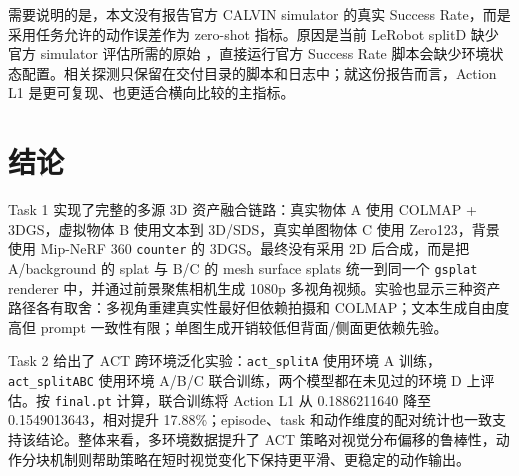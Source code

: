 \documentclass[lang=cn,a4paper,newtx,nofont,code=minted]{elegantpaper}
\begin{document}
需要说明的是，本文没有报告官方 CALVIN simulator 的真实 Success Rate，而是采用任务允许的动作误差作为 zero-shot 指标。原因是当前 LeRobot splitD 缺少官方 simulator 评估所需的原始 ，直接运行官方 Success Rate 脚本会缺少环境状态配置。相关探测只保留在交付目录的脚本和日志中；就这份报告而言，Action L1 是更可复现、也更适合横向比较的主指标。

\section{结论}

Task 1 实现了完整的多源 3D 资产融合链路：真实物体 A 使用 COLMAP + 3DGS，虚拟物体 B 使用文本到 3D/SDS，真实单图物体 C 使用 Zero123，背景使用 Mip-NeRF 360 \texttt{counter} 的 3DGS。最终没有采用 2D 后合成，而是把 A/background 的 splat 与 B/C 的 mesh surface splats 统一到同一个 \texttt{gsplat} renderer 中，并通过前景聚焦相机生成 1080p 多视角视频。实验也显示三种资产路径各有取舍：多视角重建真实性最好但依赖拍摄和 COLMAP；文本生成自由度高但 prompt 一致性有限；单图生成开销较低但背面/侧面更依赖先验。

Task 2 给出了 ACT 跨环境泛化实验：\texttt{act\_splitA} 使用环境 A 训练，\texttt{act\_splitABC} 使用环境 A/B/C 联合训练，两个模型都在未见过的环境 D 上评估。按 \texttt{final.pt} 计算，联合训练将 Action L1 从 0.1886211640 降至 0.1549013643，相对提升 17.88\%；episode、task 和动作维度的配对统计也一致支持该结论。整体来看，多环境数据提升了 ACT 策略对视觉分布偏移的鲁棒性，动作分块机制则帮助策略在短时视觉变化下保持更平滑、更稳定的动作输出。
\end{document}
